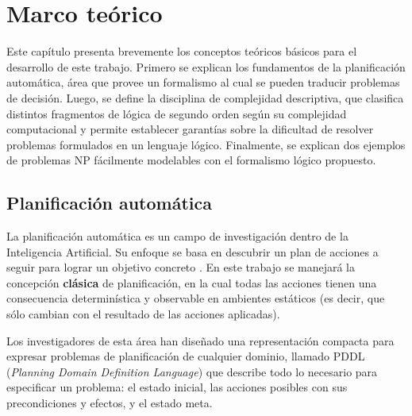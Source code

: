 
\chapter{Marco teórico}
\label{Chapter1}

Este capítulo presenta brevemente los conceptos teóricos básicos para el
desarrollo de este trabajo. Primero se explican los fundamentos de la
planificación automática, área que provee un formalismo al cual se pueden
traducir problemas de decisión. Luego, se define la disciplina de complejidad
descriptiva, que clasifica distintos fragmentos de lógica de segundo orden
según su complejidad computacional y permite establecer garantías sobre la
dificultad de resolver problemas formulados en un lenguaje lógico.
Finalmente, se explican dos ejemplos de problemas NP fácilmente modelables
con el formalismo lógico propuesto.


\section{Planificación automática}
La planificación automática es un campo de investigación dentro de la Inteligencia
Artificial. Su enfoque se basa en descubrir un plan de acciones a seguir para
lograr un objetivo concreto \citep{russell:book}. En este trabajo se manejará
la concepción \textbf{clásica} de planificación, en la cual todas las acciones
tienen una consecuencia determinística y observable en ambientes estáticos (es
decir, que sólo cambian con el resultado de las acciones aplicadas).

Los investigadores de esta área han diseñado una representación compacta para
expresar problemas de planificación de cualquier dominio, llamado PDDL 
(\textit{Planning Domain Definition Language}) que describe todo lo necesario
para especificar un problema: el estado inicial, las acciones posibles con sus
precondiciones y efectos, y el estado meta.

